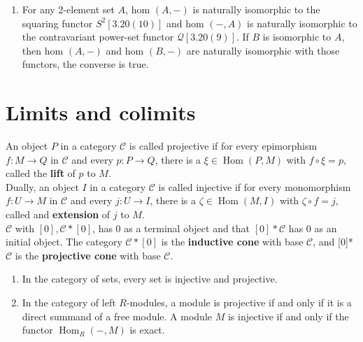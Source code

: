 \begin{example}
\begin{example}
\begin{enumerate}
        \item For any 2-element set $A$, hom $(A,-)$ is naturally isomorphic to the squaring functor $S^2[3.20(10)]$ and hom $(-, A)$ is naturally isomorphic to the contravariant power-set functor $\mathcal{Q}[3.20(9)]$. If $B$ is isomorphic to $A$, then hom $(A,-)$ and hom $(B,-)$ are naturally isomorphic with those functors, the converse is true.
    \end{enumerate}
\end{example}






\section{Limits and colimits}

An object $P$ in a category $\mathcal{C}$ is called projective if for every epimorphism $f: M \rightarrow Q$ in $\mathcal{C}$ and every $p: P \rightarrow Q$, there is a $\xi \in \operatorname{Hom}(P, M)$ with $f \circ \xi=p$, called the \textbf{lift} of $p$ to $M$.\\
Dually, an object $I$ in a category $\mathcal{C}$ is called injective if for every monomorphism $f: U \rightarrow M$ in $\mathcal{C}$ and every $j: U \rightarrow I$, there is a $\zeta \in \operatorname{Hom}(M, I)$ with $\zeta \circ f=j$, called and \textbf{extension} of $j$ to $M$.\\
$\mathcal{C}$ with $[0], \mathcal{C} *[0]$, has 0 as a terminal object and that $[0] * \mathcal{C}$ has 0 as an initial object. The category $\mathcal{C} *[0]$ is the \textbf{inductive cone} with base $\mathcal{C}$, and [0]* $\mathcal{C}$ is the \textbf{projective cone} with base $\mathcal{C}$.


\begin{example}
    \begin{enumerate}
        \item In the category of sets, every set is injective and projective.
        \item In the category of left $R$-modules, a module is projective if and only if it is a direct summand of a free module. A module $M$ is injective if and only if the functor $\operatorname{Hom}_R(-, M)$ is exact.
    \end{enumerate}
\end{example}


\end{example}
